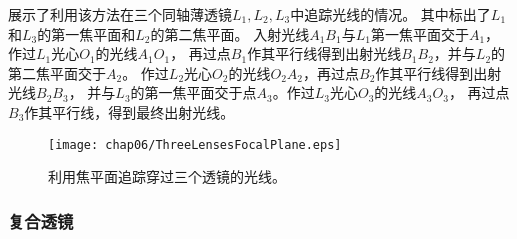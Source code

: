 展示了利用该方法在三个同轴薄透镜$L_1,L_2,L_3$中追踪光线的情况。
其中标出了$L_1$和$L_3$的第一焦平面和$L_2$的第二焦平面。
入射光线$A_1B_1$与$L_1$第一焦平面交于$A_1$，作过$L_1$光心$O_1$的光线$A_1O_1$，
再过点$B_1$作其平行线得到出射光线$B_1B_2$，并与$L_2$的第二焦平面交于$A_2$。
作过$L_2$光心$O_2$的光线$O_2A_2$，再过点$B_2$作其平行线得到出射光线$B_2B_3$，
并与$L_3$的第一焦平面交于点$A_3$。作过$L_3$光心$O_3$的光线$A_3O_3$，
再过点$B_3$作其平行线，得到最终出射光线。
\begin{figure}[htbp]
    \centering\texttt{[image: chap06/ThreeLensesFocalPlane.eps]}
    \caption{利用焦平面追踪穿过三个透镜的光线。}
    \label{fig:6.44}
\end{figure}

\subsubsection{复合透镜}